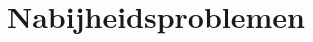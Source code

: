 \documentclass[tmi_notities.tex]{subfiles}
\begin{document}
\chapter{Nabijheidsproblemen}
\end{document}
